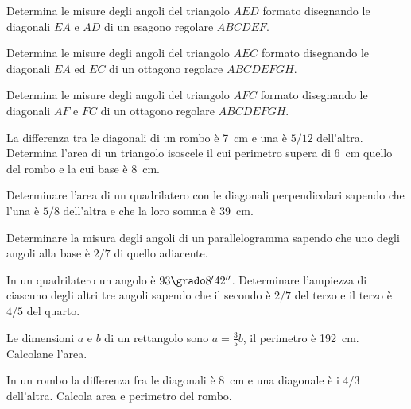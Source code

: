 \begin{multicols}{2}
\begin{esercizio}
\label{ese:7.55}
Determina le misure degli angoli del triangolo \(AED\) formato 
disegnando le diagonali \(EA\) e \(AD\) di un esagono regolare \(ABCDEF\).
\end{esercizio}

\begin{esercizio}
\label{ese:7.56}
Determina le misure degli angoli del triangolo \(AEC\) formato 
disegnando le diagonali \(EA\) ed \(EC\) di un ottagono regolare 
\(ABCDEFGH\).
\end{esercizio}

\begin{esercizio}
\label{ese:7.57}
Determina le misure degli angoli del triangolo \(AFC\) formato 
disegnando le diagonali \(AF\) e \(FC\) di un ottagono regolare 
\(ABCDEFGH\).
\end{esercizio}

\begin{esercizio}
\label{ese:7.58}
La differenza tra le diagonali di un rombo è 7~cm e una è \(5/12\) 
dell'altra. Determina l'area di un triangolo isoscele il cui 
perimetro supera di 6~cm quello del rombo e la cui base è 8~cm.
\end{esercizio}

\begin{esercizio}
\label{ese:7.59}
Determinare l'area di un quadrilatero con le diagonali perpendicolari 
sapendo che l'una è \(5/8\) dell'altra e che la loro somma è 39~cm.
\end{esercizio}

\begin{esercizio}
\label{ese:7.60}
Determinare la misura degli angoli di un parallelogramma sapendo che 
uno degli angoli alla base è \(2/7\) di quello adiacente.
\end{esercizio}

\begin{esercizio}
\label{ese:7.61}
In un quadrilatero un angolo è \(93\grado8'42''\). Determinare 
l'ampiezza di ciascuno degli altri tre angoli sapendo che il secondo 
è \(2/7\) del terzo e il terzo è \(4/5\) del quarto.
\end{esercizio}

\begin{esercizio}
\label{ese:7.62}
Le dimensioni \(a\) e \(b\) di un rettangolo sono \(a=\frac{3}{5}b\), il 
perimetro è 192~cm. Calcolane l'area.
\end{esercizio}

\begin{esercizio}
\label{ese:7.63}
In un rombo la differenza fra le diagonali è 8~cm e una diagonale è i 
\(4/3\) dell'altra. Calcola area e perimetro del rombo.
\end{esercizio}


\end{multicols}
